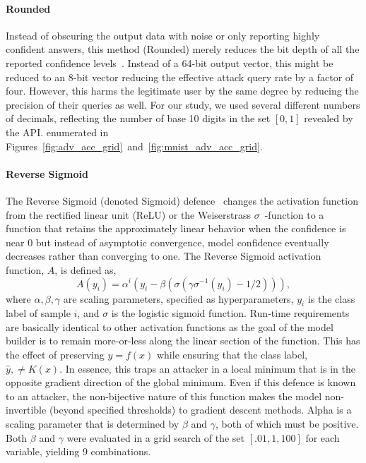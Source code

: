 \paragraph{Rounded}
Instead of obscuring the output data with noise or only reporting highly confident answers, this method (Rounded) merely reduces the bit depth of all the reported confidence levels~\cite{discretization}.
Instead of a 64-bit output vector, this might be reduced to an 8-bit vector reducing the effective attack query rate by a factor of four.
However, this harms the legitimate user by the same degree by reducing the precision of their queries as well.
For our study, we used several different numbers of decimals, reflecting the number of base 10 digits in the set $[0,1]$ revealed by the API.
enumerated in Figures~\ref{fig:adv_acc_grid}~and~\ref{fig:mnist_adv_acc_grid}.


\paragraph{Reverse Sigmoid}
The Reverse Sigmoid (denoted Sigmoid) defence~\cite{reverse_sigmoid} changes the activation function from the rectified linear unit (ReLU) or the Weiserstrass $\sigma \!\!$~-function to a function that retains the approximately linear behavior when the confidence is near 0 but instead of asymptotic convergence, model confidence eventually decreases rather than converging to one.
The Reverse Sigmoid activation function, $A$, is defined as,
$$
    A(y_i) = \alpha ^i (y_i - \beta(\sigma(\gamma \sigma^{-1}(y_i) - 1/2))),
$$
where $\alpha, \beta, \gamma$ are scaling parameters, specified as hyperparameters, $y_i$ is the class label of sample $i$, and $\sigma$ is the logistic sigmoid function.
Run-time requirements are basically identical to other activation functions as the goal of the model builder is to remain more-or-less along the linear section of the function.
This has the effect of preserving $y = f(x)$ while ensuring that the class label, $\hat{y},  \neq K(x)$.
In essence, this traps an attacker in a local minimum that is in the opposite gradient direction of the global minimum.
Even if this defence is known to an attacker, the non-bijective nature of this function makes the model non-invertible (beyond specified thresholds) to gradient descent methods.
Alpha is a scaling parameter that is determined by $\beta$ and $\gamma$, both of which must be positive.
Both $\beta$ and $\gamma$ were evaluated in a grid search of the set $[.01, 1, 100]$ for each variable, yielding 9 combinations.


